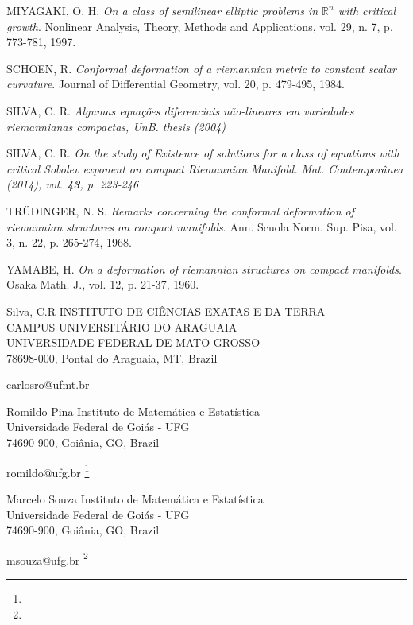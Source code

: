 \documentclass[12pt]{article}
\begin{document}
\begin{thebibliography}{9}
 MIYAGAKI, O. H. {\it On a class of semilinear elliptic problems in $\mathbb{R}^n$ with critical growth}. Nonlinear Analysis, Theory, Methods and Applications, vol. 29, n. 7, p. 773-781, 1997.

 SCHOEN, R. {\it Conformal deformation of a riemannian metric to constant scalar curvature}. Journal of Differential Geometry, vol. 20, p. 479-495, 1984.

  SILVA, C. R. {\it Algumas equações diferenciais não-lineares em variedades riemannianas compactas, UnB. thesis (2004)}

 SILVA, C. R. {\it On the study of Existence of solutions for a
class of equations with critical Sobolev exponent on compact Riemannian Manifold. Mat. Contempor\^anea (2014), vol. {\bf  43}, p. 223-246}

 TRÜDINGER, N. S. {\it Remarks concerning the conformal deformation of riemannian structures on compact manifolds}. Ann. Scuola Norm. Sup. Pisa, vol. 3, n. 22, p. 265-274, 1968.

 YAMABE, H. {\it On a deformation of riemannian structures on compact manifolds}. Osaka Math. J., vol. 12, p. 21-37, 1960.

\end{thebibliography}

{Silva, C.R}
{{INSTITUTO DE CI\^ENCIAS EXATAS E DA TERRA\\
 CAMPUS UNIVERSIT\'ARIO DO ARAGUAIA\\UNIVERSIDADE FEDERAL DE MATO GROSSO
 \\  78698-000, Pontal do Araguaia,  MT, Brazil}  }

{carlosro@ufmt.br}

{Romildo Pina}
{
Instituto de Matem\'atica e Estat\'istica\\
Universidade Federal de Goi\'as - UFG\\
74690-900, Goi\^ania, GO, Brazil}

{romildo@ufg.br}
\thanks{}

{Marcelo Souza}
{
Instituto de Matem\'atica e Estat\'istica\\
Universidade Federal de Goi\'as - UFG\\
74690-900, Goi\^ania, GO, Brazil}

{msouza@ufg.br}
\thanks{}
\end{document}
